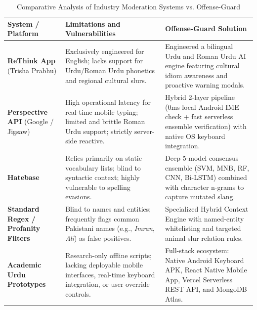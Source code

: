 \documentclass[A4paper,12pt]{report}
\theoremstyle{plain}
\theoremstyle{definition}
\theoremstyle{remark}
\numberwithin{equation}{section}
\begin{document}
\begin{table}[H]
\centering
\caption{Comparative Analysis of Industry Moderation Systems vs. Offense-Guard}
\label{tab:analysis_systems}
\renewcommand{\arraystretch}{1.4}
\begin{tabular}{|p{3.2cm}|p{5.8cm}|p{7cm}|}
\hline
\textbf{System / Platform} & \textbf{Limitations and Vulnerabilities} & \textbf{Offense-Guard Solution} \\ 
\hline
\textbf{ReThink App} (Trisha Prabhu) & Exclusively engineered for English; lacks support for Urdu/Roman Urdu phonetics and regional cultural slurs. & Engineered a bilingual Urdu and Roman Urdu AI engine featuring cultural idiom awareness and proactive warning modals. \\ 
\hline
\textbf{Perspective API} (Google / Jigsaw) & High operational latency for real-time mobile typing; limited and brittle Roman Urdu support; strictly server-side reactive. & Hybrid 2-layer pipeline (0ms local Android IME check + fast serverless ensemble verification) with native OS keyboard integration. \\ 
\hline
\textbf{Hatebase} & Relies primarily on static vocabulary lists; blind to syntactic context; highly vulnerable to spelling evasions. & Deep 5-model consensus ensemble (SVM, MNB, RF, CNN, Bi-LSTM) combined with character n-grams to capture mutated slang. \\ 
\hline
\textbf{Standard Regex / Profanity Filters} & Blind to names and entities; frequently flags common Pakistani names (e.g., \textit{Imran}, \textit{Ali}) as false positives. & Specialized Hybrid Context Engine with named-entity whitelisting and targeted animal slur relation rules. \\ 
\hline
\textbf{Academic Urdu Prototypes} & Research-only offline scripts; lacking deployable mobile interfaces, real-time keyboard integration, or user override controls. & Full-stack ecosystem: Native Android Keyboard APK, React Native Mobile App, Vercel Serverless REST API, and MongoDB Atlas. \\ 
\hline
\end{tabular}
\end{table}
\end{document}

